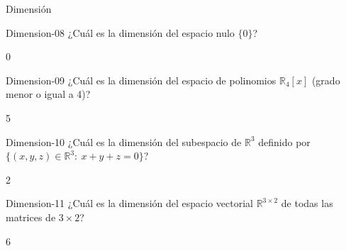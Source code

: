 \documentclass[a4,11pt]{aleph-notas}
\begin{document}
\begin{quiz}{Dimensión}
\begin{numerical}[tolerance=0]%
    {Dimension-08}
    ¿Cuál es la dimensión del espacio nulo \(\{0\}\)?
    \item 0
\end{numerical}

\begin{numerical}[tolerance=0]%
    {Dimension-09}
    ¿Cuál es la dimensión del espacio de polinomios \(\mathbb{R}_4[x]\) (grado menor o igual a 4)?
    \item 5
\end{numerical}

\begin{numerical}[tolerance=0]%
    {Dimension-10}
    ¿Cuál es la dimensión del subespacio de \(\mathbb{R}^3\) definido por \(\{(x,y,z)\in\mathbb{R}^3:\ x+y+z=0\}\)?
    \item 2
\end{numerical}

\begin{numerical}[tolerance=0]%
    {Dimension-11}
    ¿Cuál es la dimensión del espacio vectorial \(\mathbb{R}^{3\times 2}\) de todas las matrices de \(3\times 2\)?
    \item 6
\end{numerical}


\end{quiz}
\end{document}
